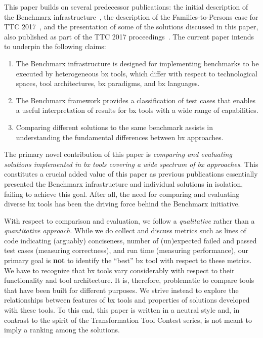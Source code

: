 This paper builds on several predecessor publications: the initial description of the Benchmarx infrastructure~\cite{Anjorin2017}, the description of the Families-to-Persons case for TTC 2017~\cite{Anjorin2017a}, and the presentation of some of the solutions discussed in this paper, also published as part of the TTC 2017 proceedings~\cite{Hinkel2017,Samimi-Dehkordi2017,Zundorf2017}. 
%
The current paper intends to underpin the following claims:

\begin{enumerate}
	\item The Benchmarx infrastructure is designed for implementing benchmarks to be executed by heterogeneous bx tools, which differ with respect to technological spaces, tool architectures, bx paradigms, and bx languages.
	\item The Benchmarx framework provides a classification of test cases that enables a useful interpretation of results for bx tools with a wide range of capabilities.  
	\item Comparing different solutions to the same benchmark assists in understanding the fundamental differences between bx approaches.
\end{enumerate}

The primary novel contribution of this paper is \emph{comparing and evaluating solutions implemented in bx tools covering a wide spectrum of bx approaches}.
This constitutes a crucial added value of this paper as previous publications essentially presented the Benchmarx infrastructure and individual solutions in isolation, failing to achieve this goal. 
After all, the need for comparing and evaluating diverse bx tools has been the driving force behind the Benchmarx initiative.

With respect to comparison and evaluation, we follow a \emph{qualitative} rather than a \emph{quantitative approach}. 
While we do collect and discuss metrics such as lines of code indicating (arguably) conciseness, number of (un)expected failed and passed test cases (measuring correctness), and run time (measuring performance), our primary goal is \textbf{not} to identify the ``best'' bx tool with respect to these metrics. 
We have to recognize that bx tools vary considerably with respect to their functionality and tool architecture. 
It is, therefore, problematic to compare tools that have been built for different purposes. 
We strive instead to explore the relationships between features of bx tools and properties of solutions developed with these tools. 
%
To this end, this paper is written in a neutral style and, in contrast to the spirit of the Transformation Tool Contest series, is not meant to imply a ranking among the solutions. 

